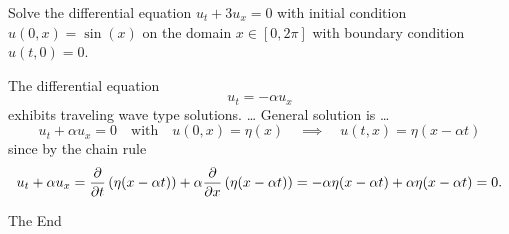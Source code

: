 \begin{problem}
    Solve the differential equation $u_t + 3u_x=0$ with initial condition $u(0,x) = \sin(x)$
    on the domain $x \in [0,2\pi]$ with boundary condition $u(t,0) = 0$.
\end{problem}
\solution{
    \[ u(t,x) = \sin(x-3t) \]
}

The differential equation
\[ u_{t} = -\alpha u_{x} \]
exhibits traveling wave type solutions.
\ldots
General solution is \ldots
\[ u_t + \alpha u_x = 0 \quad \text{with} \quad u(0,x) = \eta(x) \quad \implies \quad
    u(t,x) = \eta(x-\alpha t) \]
since by the chain rule 
\[ u_t + \alpha u_x = \frac{\partial  }{\partial t} \left( \eta(x-\alpha t) \right) + \alpha \frac{\partial  }{\partial x} \left(
    \eta(x-\alpha t) \right)=
    -\alpha \eta(x-\alpha t) + \alpha \eta(x-\alpha t) = 0. \]


\newpage
\begin{center}
    {\LARGE The End}
\end{center}
\newpage
